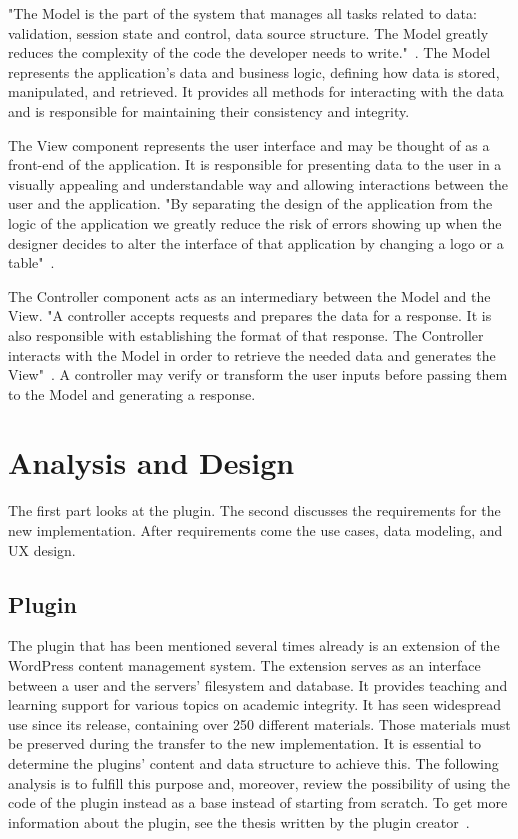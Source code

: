 \documentclass[
  digital,     %
  oneside,     %
  nosansbold,  %
  colorbold, %
  lof,         %
  lot,         %
]{fithesis4}
\begin{document}
"The Model is the part of the system that manages all tasks related to data: validation, session state and control, data source structure. The Model greatly reduces the complexity of the code the developer needs to write."~\cite{gilmore09}. The Model represents the application's data and business logic, defining how data is stored, manipulated, and retrieved. It provides all methods for interacting with the data and is responsible for maintaining their consistency and integrity.

The View component represents the user interface and may be thought of as a front-end of the application. It is responsible for presenting data to the user in a visually appealing and understandable way and allowing interactions between the user and the application. "By separating the design of the application from the logic of the application we greatly reduce the risk of errors showing up when the designer decides to alter the interface of that application by changing a logo or a table"~\cite{gilmore09}.

The Controller component acts as an intermediary between the Model and the View. "A controller accepts requests and prepares the data for a response. It is also responsible with establishing the format of that response. The Controller interacts with the Model in order to retrieve the needed data and generates the View"~\cite{gilmore09}. A controller may verify or transform the user inputs before passing them to the Model and generating a response.

\chapter{Analysis and Design}
\label{chap:analysis}

The first part looks at the plugin. The second discusses the requirements for the new implementation. After requirements come the use cases, data modeling, and UX design.

\section{Plugin}
\label{sect:plugin}

The plugin that has been mentioned several times already is an extension of the WordPress content management system. The extension serves as an interface between a user and the servers' filesystem and database. It provides teaching and learning support for various topics on academic integrity. It has seen widespread use since its release, containing over 250 different materials. Those materials must be preserved during the transfer to the new implementation. It is essential to determine the plugins' content and data structure to achieve this. The following analysis is to fulfill this purpose and, moreover, review the possibility of using the code of the plugin instead as a base instead of starting from scratch. To get more information about the plugin, see the thesis written by the plugin creator~\cite{lang18}.
\end{document}
